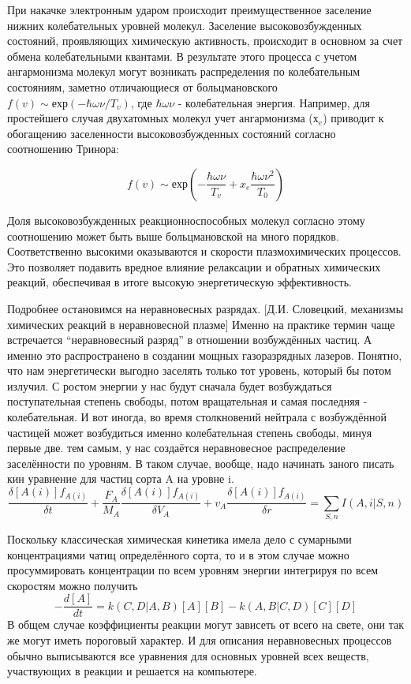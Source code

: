\documentclass[10pt, a4paper]{article}
\numberwithin{equation}{section}
\begin{document}
При накачке электронным ударом происходит преимущественное заселение нижних колебательных уровней молекул. Заселение высоковозбужденных состояний, проявляющих химическую активность, происходит в основном за счет обмена колебательными квантами. В результате этого процесса с учетом ангармонизма молекул могут возникать распределения по колебательным состояниям, заметно отличающиеся от больцмановского $f(v) \sim ехр(-\hbar \omega \nu / T_v)$, где $\hbar \omega \nu$ - колебательная энергия. Например, для простейшего случая двухатомных молекул учет ангармонизма ($х_e$) приводит к обогащению заселенности высоковозбужденных состояний согласно соотношению Тринора:

\begin{equation}
  f(v) \sim ехр(-\frac{\hbar \omega \nu} {T_v}+x_e\frac{\hbar \omega \nu^{2}}{T_0})
\end{equation}

Доля высоковозбужденных реакционноспособных молекул согласно этому соотношению может быть выше больцмановской на много порядков. Соответственно высокими оказываются и скорости плазмохимических процессов. Это позволяет подавить вредное влияние релаксации и обратных химических реакций, обеспечивая в итоге высокую энергетическую эффективность. 

Подробнее остановимся на неравновесных разрядах. [Д.И. Словецкий, механизмы химических реакций в неравновесной плазме]
Именно на практике термин чаще встречается “неравновесный разряд” в отношении возбуждённых частиц. А именно это распространено в создании мощных газоразрядных лазеров. Понятно, что нам энергетически выгодно заселять только тот уровень, который бы потом излучил. С ростом энергии у нас будут сначала будет возбуждаться поступательная степень свободы, потом вращательная и самая последняя - колебательная. И вот иногда, во время столкновений нейтрала с возбуждённой частицей может возбудиться именно колебательная степень свободы, минуя первые две. тем самым, у нас создаётся неравновесное распределение заселённости по уровням.
В таком случае, вообще, надо начинать заного писать кин уравнение для частиц сорта A на уровне i.
\begin{equation}
\frac{\delta [A(i)] f_{A(i)}}{\delta t}+\frac{F_A}{M_A}\frac{\delta [A(i)] f_{A(i)}}{\delta V_A} +v_A \frac{\delta [A(i)] f_{A(i)}}{\delta r}=\sum_{S,n} I(A,i|S,n) 
\end{equation}

Поскольку классическая химическая кинетика имела дело с сумарными концентрациями чатиц определённого сорта, то и в этом случае можно просуммировать концентрации по всем уровням энергии интегрируя по всем скоростям можно получить
 \begin{equation}
-\frac{d [A] }{dt}=k(C,D|A,B) [A][B]-k(A,B|C,D) [C][D]
\end{equation}
В общем случае коэффициенты реакции могут зависеть от всего на свете, они так же могут иметь пороговый характер. И для описания неравновесных процессов обычно выписываются все уравнения для основных уровней всех веществ, участвующих в реакции и решается на компьютере.
\end{document}
